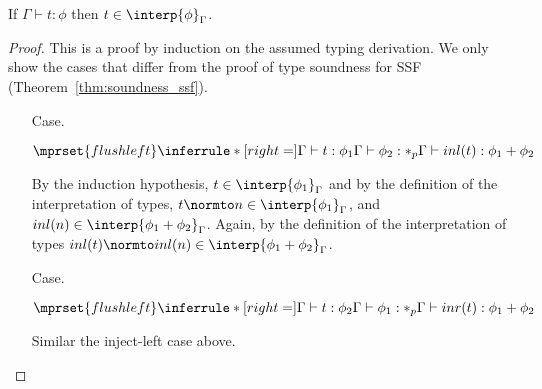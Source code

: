 \begin{thm}
  If $\Gamma \vdash t:\phi$ then $t \in \interp{\phi}_\Gamma$.
  \label{thm:soundness_ssfp}
\end{thm}
\begin{proof}
  This is a proof by induction on the assumed typing derivation.  We
  only show the cases that differ from the proof of type soundness for
  SSF (Theorem~\ref{thm:soundness_ssf}).

\begin{itemize}  
\item[Case.]\ \\
  \begin{center}
    \begin{math}
      $$\mprset{flushleft}
      \inferrule* [right=] {
        \Gamma \vdash t:\phi_1
	\\
	\Gamma \vdash \phi_2:*_p
      }{\Gamma \vdash inl(t): \phi_1+\phi_2}
    \end{math}
  \end{center}
  By the induction hypothesis, $t \in \interp{\phi_1}_\Gamma$ and by the definition of the 
  interpretation of types,
  $t \normto n \in \interp{\phi_1}_\Gamma$, and $inl(n) \in \interp{\phi_1 + \phi_2}_{\Gamma}$.  
  Again, by the definition of the interpretation of types
  $inl(t) \normto inl(n) \in \interp{\phi_1 + \phi_2}_\Gamma$.
  
\item[Case.]\ \\
  \begin{center}
    \begin{math}
      $$\mprset{flushleft}
      \inferrule* [right=] {
        \Gamma \vdash t:\phi_2
	\\
	\Gamma \vdash \phi_1:*_p
      }{\Gamma \vdash inr(t): \phi_1+\phi_2}
    \end{math}
  \end{center}
  Similar the inject-left case above.
  

\end{itemize}
\end{proof}
